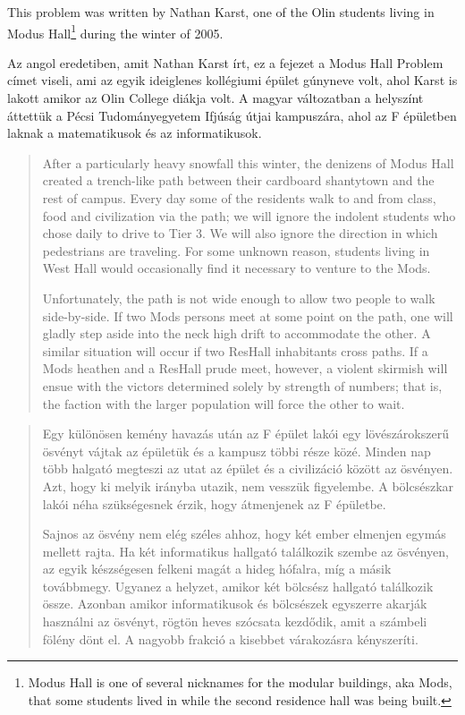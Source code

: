 \documentclass{book}
\begin{document}
This problem was written by Nathan Karst, one of the Olin students
living in Modus Hall\footnote{Modus Hall is one of several nicknames
for the modular buildings, aka Mods, that some students lived in while
the second residence hall was being built.} during the winter of 2005.

Az angol eredetiben, amit Nathan Karst írt, ez a fejezet a Modus Hall Problem címet viseli,
ami az egyik ideiglenes kollégiumi épület gúnyneve volt, ahol Karst is lakott amikor
az Olin College diákja volt. A magyar
változatban a helyszínt áttettük a Pécsi Tudományegyetem Ifjúság útjai
kampuszára, ahol az F épületben laknak a matematikusok és az informatikusok.

\begin{quote}
After a particularly heavy snowfall this winter, the denizens of Modus
Hall created a trench-like path between their cardboard shantytown and
the rest of campus.  Every day some of the residents walk to and from
class, food and civilization via the path; we will ignore the
indolent students who chose daily to drive to Tier 3.  We will also
ignore the direction in which pedestrians are traveling.  For some
unknown reason, students living in West Hall would occasionally find it
necessary to venture to the Mods.

Unfortunately, the path is not wide enough to allow two people
to walk side-by-side.  If two Mods persons meet at some point on the
path, one will gladly step aside into the neck high drift to accommodate
the other.  A similar situation will occur if two ResHall inhabitants
cross paths.  If a Mods heathen and a ResHall prude meet, however, a
violent skirmish will ensue with the victors determined solely by
strength of numbers; that is, the faction with the larger population will
force the other to wait.
\end{quote} 

\begin{quote}
Egy különösen kemény havazás után az F épület lakói egy lövészárokszerű ösvényt 
vájtak az épületük és a kampusz többi része közé. Minden nap több halgató megteszi
az utat az épület és a civilizáció között az ösvényen. Azt, hogy ki melyik irányba
utazik, nem vesszük figyelembe. A bölcsészkar lakói néha szükségesnek érzik, hogy átmenjenek
az F épületbe.

Sajnos az ösvény nem elég széles ahhoz, hogy két ember elmenjen egymás mellett rajta.
Ha két informatikus hallgató találkozik szembe az ösvényen, az egyik készségesen
felkeni magát a hideg hófalra, míg a másik továbbmegy. Ugyanez a helyzet, amikor két bölcsész hallgató találkozik össze.
Azonban amikor informatikusok és bölcsészek egyszerre akarják használni az ösvényt,
rögtön heves szócsata kezdődik, amit a számbeli fölény dönt el. A nagyobb
frakció a kisebbet várakozásra kényszeríti.
\end{quote}
\end{document}
